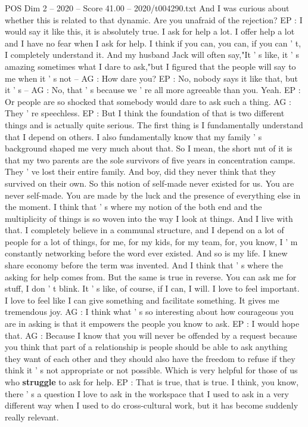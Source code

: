 \begin{textsample}{POS Dim 2 – 2020 – Score 41.00 – 2020/t004290.txt}
And I was curious about whether this is related to that dynamic.
Are you unafraid of the rejection?
EP : I would say it like this, it is absolutely true.
I ask for help a lot.
I offer help a lot and I have no fear when I ask for help.
I think if you can, you can, if you can ' t, I completely understand it.
And my husband Jack will often say,"It ' s like, it ' s amazing sometimes what I dare to ask,"but I figured that the people will say to me when it ' s not -- AG : How dare you?
EP : No, nobody says it like that, but it ' s -- AG : No, that ' s because we ' re all more agreeable than you.
Yeah.
EP : Or people are so shocked that somebody would dare to ask such a thing.
AG : They ' re speechless.
EP : But I think the foundation of that is two different things and is actually quite serious.
The first thing is I fundamentally understand that I depend on others.
I also fundamentally know that my family ' s background shaped me very much about that.
So I mean, the short nut of it is that my two parents are the sole survivors of five years in concentration camps.
They ' ve lost their entire family.
And boy, did they never think that they survived on their own.
So this notion of self-made never existed for us.
You are never self-made.
You are made by the luck and the presence of everything else in the moment.
I think that ' s where my notion of the both end and the multiplicity of things is so woven into the way I look at things.
And I live with that.
I completely believe in a communal structure, and I depend on a lot of people for a lot of things, for me, for my kids, for my team, for, you know, I ' m constantly networking before the word ever existed.
And so is my life.
I knew share economy before the term was invented.
And I think that ' s where the asking for help comes from.
But the same is true in reverse.
You can ask me for stuff, I don ' t blink.
It ' s like, of course, if I can, I will.
I love to feel important.
I love to feel like I can give something and facilitate something.
It gives me tremendous joy.
AG : I think what ' s so interesting about how courageous you are in asking is that it empowers the people you know to ask.
EP : I would hope that.
AG : Because I know that you will never be offended by a request because you think that part of a relationship is people should be able to ask anything they want of each other and they should also have the freedom to refuse if they think it ' s not appropriate or not possible.
Which is very helpful for those of us who \textbf{struggle} to ask for help.
EP : That is true, that is true.
I think, you know, there ' s a question I love to ask in the workspace that I used to ask in a very different way when I used to do cross-cultural work, but it has become suddenly really relevant.

\end{textsample}
